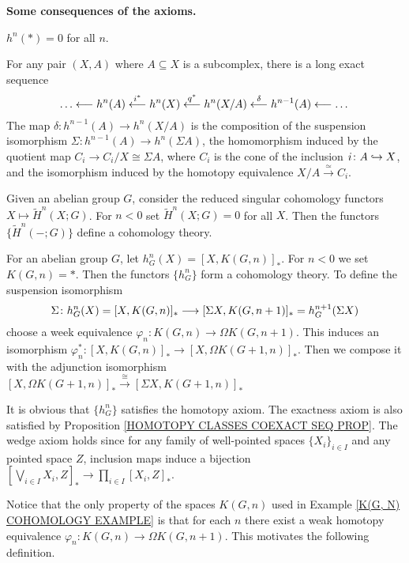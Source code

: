 \begin{nn}{\bf Some consequences of the axioms.}
\bit
\item $h^{n}(\ast) = 0$ for all $n$.
\item For any pair $(X, A)$ where $A\subseteq X$ is a subcomplex, there is a long exact 
sequence 
\[
\dots \lla 
h^{n}(A) \overset{i^{\ast}}{\lla} h^{n}(X)  \overset{q^{\ast}}{\lla} h^{n}(X/A)  
\overset{\delta}{\lla} h^{n-1}(A)
\lla \dots
\]
The map $\delta \colon  h^{n-1}(A) \to h^{n}(X/A)$ is the composition of the suspension 
isomorphism $\Sigma \colon h^{n-1}(A) \to h^{n}(\Sigma A)$, the homomorphism induced by 
the quotient map $C_{i} \to C_{i}/X \cong \Sigma A$, where $C_{i}$ is the cone of the inclusion
$i\colon A \hookrightarrow X$, and the  isomorphism induced by the homotopy equivalence 
$X/A \overset{\simeq}{\to} C_{i}$. 
\eit
\end{nn}

\begin{example}
Given an abelian group $G$, consider the reduced singular cohomology functors 
$X \mapsto \widetilde{H}^{n}(X; G)$. For $n < 0$ set $\widetilde{H}^{n}(X; G) = 0$ 
for all $X$. Then the functors $\{\widetilde{H}^{n}(-; G)\}$ define 
a cohomology theory.
\end{example}


\begin{example}
\label{K(G, N) COHOMOLOGY EXAMPLE}
For an abelian group $G$, let $h^{n}_{G}(X) = [X, K(G, n)]_{\ast}$. For $n <0$
we set $K(G, n) = \ast$. Then the functors $\{ h^{n}_{G}\}$ form 
a cohomology theory. To define the suspension isomorphism
\[
\Sigma \colon h^{n}_{G}(X) = [X, K(G, n)]_{\ast} \longrightarrow 
[\Sigma X, K(G, n+1)]_{\ast} = h^{n+1}_{G}(\Sigma X)
\]
choose a week equivalence $\varphi_{n}\colon K(G, n) \to \Omega K(G, n+1)$. 
This induces an isomorphism  
$\varphi_{n}^{\ast} \colon [X, K(G, n)]_{\ast} \to [X, \Omega K(G+1, n)]_{\ast}$. 
Then we compose it with the adjunction isomorphism 
$[X, \Omega K(G+1, n)]_{\ast} \overset{\cong}{\to} [\Sigma X, K(G+1, n)]_{\ast}$

It is obvious that $\{h_{G}^{n}\}$ satisfies the homotopy axiom.
The exactness axiom is also satisfied by
Proposition \ref{HOMOTOPY CLASSES COEXACT SEQ PROP}. The wedge axiom holds 
since for any family of well-pointed spaces $\{X_{i}\}_{i\in I}$ 
and any pointed space $Z$, inclusion maps induce a bijection 
$[\bigvee_{i\in I} X_{i}, Z]_{\ast} \to \prod_{i\in I} [X_{i}, Z]_{\ast}$.
\end{example}

Notice that the only property of the spaces $K(G, n)$ used in 
Example \ref{K(G, N) COHOMOLOGY EXAMPLE}  is that for each $n$ there exist a weak 
homotopy equivalence $\varphi_{n}\colon K(G, n) \to \Omega K(G, n+1)$. 
This motivates the following definition. 

